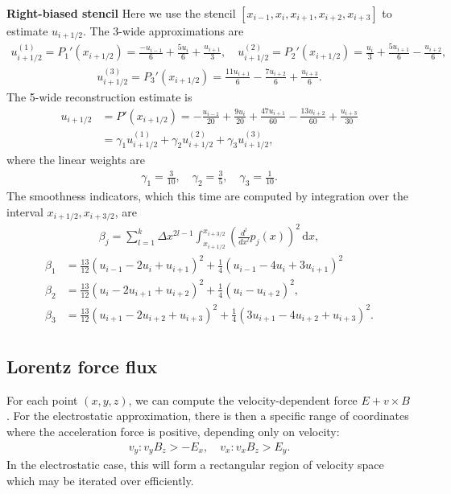 \documentclass{article}
\begin{document}
\textbf{Right-biased stencil}
Here we use the stencil $[x_{i-1}, x_i, x_{i+1}, x_{i+2}, x_{i+3}]$ to estimate $u_{i+1/2}$.
The 3-wide approximations are
\begin{align*}
    u^{(1)}_{i+1/2} = P_1'(x_{i+1/2}) = \frac{-u_{i-1}}{6} + \frac{5u_i}{6} + \frac{u_{i+1}}{3}, \quad u^{(2)}_{i+1/2} = P_2'(x_{i+1/2}) = \frac{u_i}{3} + \frac{5u_{i+1}}{6} - \frac{u_{i+2}}{6},
\end{align*}
\begin{align*}
    u^{(3)}_{i+1/2} = P_3'(x_{i+1/2}) = \frac{11u_{i+1}}{6} - \frac{7u_{i+2}}{6} + \frac{u_{i+3}}{6}.
\end{align*}
The 5-wide reconstruction estimate is
\begin{align*}
    u_{i+1/2} &= P'(x_{i+1/2}) = -\frac{u_{i-1}}{20} + \frac{9u_{i}}{20} + \frac{47 u_{i+1}}{60} - \frac{13u_{i+2}}{60} + \frac{u_{i+3}}{30} \\
              &= \gamma_1 u^{(1)}_{i+1/2} + \gamma_2 u^{(2)}_{i+1/2} + \gamma_3 u^{(3)}_{i+1/2},
\end{align*}
where the linear weights are
\begin{align*}
\gamma_1 = \frac{3}{10}, \quad \gamma_2 = \frac{3}{5}, \quad \gamma_3 = \frac{1}{10}.
\end{align*}
The smoothness indicators, which this time are computed by integration over the interval $x_{i+1/2}, x_{i+3/2}$, are
\begin{align*}
    \beta_j = \sum_{l=1}^k \Delta x^{2l-1} \int_{x_{i+1/2}}^{x_{i+3/2}} \left( \frac{d^l}{dx^l}p_j(x) \right)^2\,\mathrm{d} x,
\end{align*}
\begin{align*}
    \beta_1 &= \frac{13}{12}(u_{i-1} - 2u_{i} + u_{i+1})^2 + \frac{1}{4}(u_{i-1} - 4u_{i} + 3u_{i+1})^2 \\
    \beta_2 &= \frac{13}{12}(u_{i} - 2 u_{i+1} + u_{i+2})^2 + \frac{1}{4}(u_{i} - u_{i+2})^2, \\
    \beta_3 &= \frac{13}{12}(u_{i+1} - 2 u_{i+2} + u_{i+3})^2 + \frac{1}{4}(3u_{i+1} - 4u_{i+2} + u_{i+3})^2. \\
\end{align*}

\subsection{Lorentz force flux}
For each point $(x, y, z)$, we can compute the velocity-dependent force $E + v\times B$.
For the electrostatic approximation, there is then a specific range of coordinates where 
the acceleration force is positive, depending only on velocity:
\begin{align*}
v_y : v_y B_z > -E_x, \quad v_x : v_x B_z > E_y.
\end{align*}
In the electrostatic case, this will form a rectangular region of velocity space which
may be iterated over efficiently.
\end{document}
